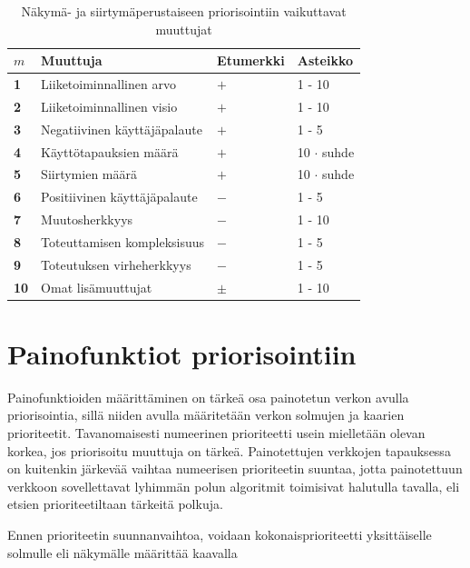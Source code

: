   \begin{table}[H]
    \caption{Näkymä- ja siirtymäperustaiseen priorisointiin vaikuttavat muuttujat}
    \label{tab:priorisointiin_vaikuttavat_muuttujat}
    \centering
    \begin{tabular}{l|l|l|l} \hline
    \(m\) & \textbf{Muuttuja} & \textbf{Etumerkki} & \textbf{Asteikko} \\ \hline
    \textbf{1} & Liiketoiminnallinen arvo & \(+\) & 1 - 10 \\
    \textbf{2} & Liiketoiminnallinen visio & \(+\) & 1 - 10 \\
    \textbf{3} & Negatiivinen käyttäjäpalaute & \(+\) & 1 - 5 \\
    \textbf{4} & Käyttötapauksien määrä & \(+\) & 10 \(\cdot\) suhde  \\
    \textbf{5} & Siirtymien määrä & \(+\) & 10 \(\cdot\) suhde  \\
    \textbf{6} & Positiivinen käyttäjäpalaute & \(-\) & 1 - 5  \\
    \textbf{7} & Muutosherkkyys & \(-\) & 1 - 10  \\
    \textbf{8} & Toteuttamisen kompleksisuus & \(-\) & 1 - 5  \\
    \textbf{9} & Toteutuksen virheherkkyys & \(-\) & 1 - 5  \\
    \textbf{10} & Omat lisämuuttujat & \(\pm\) & 1 - 10 \\ \hline
    \end{tabular}
  \end{table}

\section{Painofunktiot priorisointiin} \label{ch:10_painofunktiot_priorisointiin}

  Painofunktioiden määrittäminen on tärkeä osa painotetun verkon avulla priorisointia, sillä niiden avulla määritetään verkon solmujen ja kaarien prioriteetit.
  Tavanomaisesti numeerinen prioriteetti usein mielletään olevan korkea, jos priorisoitu muuttuja on tärkeä.
  Painotettujen verkkojen tapauksessa on kuitenkin järkevää vaihtaa numeerisen prioriteetin suuntaa, jotta painotettuun verkkoon sovellettavat lyhimmän polun algoritmit toimisivat halutulla tavalla, eli etsien prioriteetiltaan tärkeitä polkuja.

  Ennen prioriteetin suunnanvaihtoa, voidaan kokonaisprioriteetti yksittäiselle solmulle eli näkymälle määrittää kaavalla

